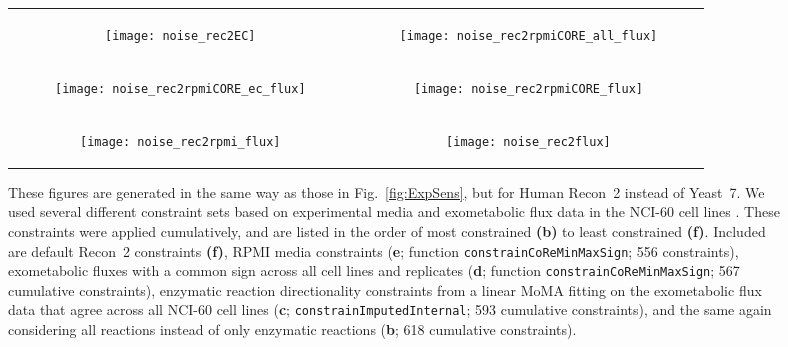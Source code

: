 \begin{figure}[!htb]
\begin{tabular}{cc}
  \begin{subfigure}[b]{0.5\textwidth}
  \texttt{[image: noise\_rec2EC]}
  \caption{} \label{fig:ExpSensRec2:A}
  \end{subfigure}
&
  \begin{subfigure}[b]{0.5\textwidth}
  \texttt{[image: noise\_rec2rpmiCORE\_all\_flux]}
  \caption{} \label{fig:ExpSensRec2:B}
  \end{subfigure} 
\\
  \begin{subfigure}[b]{0.5\textwidth}
  \texttt{[image: noise\_rec2rpmiCORE\_ec\_flux]}
  \caption{} \label{fig:ExpSensRec2:C}
  \end{subfigure} 
&
  \begin{subfigure}[b]{0.5\textwidth}
  \texttt{[image: noise\_rec2rpmiCORE\_flux]}
  \caption{} \label{fig:ExpSensRec2:D}
  \end{subfigure} 
\\
  \begin{subfigure}[b]{0.5\textwidth}
  \texttt{[image: noise\_rec2rpmi\_flux]}
  \caption{} \label{fig:ExpSensRec2:E}
  \end{subfigure} 
&
  \begin{subfigure}[b]{0.5\textwidth}
  \texttt{[image: noise\_rec2flux]}
  \caption{} \label{fig:ExpSensRec2:F}
  \end{subfigure} 
\\
\end{tabular}
\caption{ These figures are generated in the same way as those in
Fig.~\ref{fig:ExpSens}, but for Human Recon~2 instead of Yeast~7. We
used several different constraint sets based on experimental media and
exometabolic flux data in the NCI-60 cell lines
\citep{Jain2012}. These constraints were applied cumulatively, and are
listed in the order of most constrained \textbf{(b)} to least
constrained \textbf{(f)}. Included are default Recon~2 constraints
\textbf{(f)}, RPMI media constraints (\textbf{e}; function
\texttt{constrainCoReMinMaxSign}; 556 constraints), exometabolic
fluxes with a common sign across all cell lines and replicates
(\textbf{d}; function \texttt{constrainCoReMinMaxSign}; 567 cumulative
constraints), enzymatic reaction directionality constraints from a
linear MoMA fitting on the exometabolic flux data that agree across
all NCI-60 cell lines (\textbf{c};
\texttt{constrainImputed\-Internal}; 593 cumulative constraints), and
the same again considering all reactions instead of only enzymatic
reactions (\textbf{b}; 618 cumulative constraints).}
\label{fig:ExpSensRec2}
\end{figure}
\FloatBarrier


